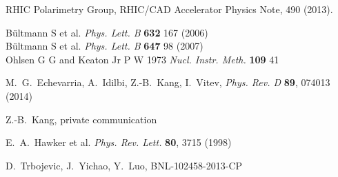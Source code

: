 \documentclass[12pt]{article}
\begin{document}
\begin{thebibliography}{9}
RHIC Polarimetry Group, RHIC/CAD Accelerator Physics Note, 490 (2013).

B\"{u}ltmann S et al. {\it Phys. Lett. B} {\bf 632} 167 (2006)\\
B\"{u}ltmann S et al. {\it Phys. Lett. B} {\bf 647} 98 (2007)\\
Ohlsen G G and Keaton Jr P W 1973 {\it Nucl. Instr. Meth.} {\bf 109} 41

M.~G.~Echevarria, A.~Idilbi, Z.-B.~Kang, I.~Vitev,
{\it Phys. Rev. D} {\bf 89}, 074013 (2014)

Z.-B.~Kang, private communication

E.~A.~Hawker et al. {\it Phys. Rev. Lett.} {\bf 80}, 3715 (1998)

D.~Trbojevic, J.~Yichao, Y.~Luo, BNL-102458-2013-CP
\end{thebibliography}
\end{document}
